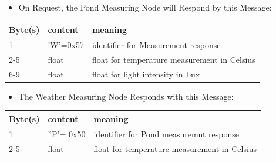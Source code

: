\documentclass{beamer}
\begin{document}
\frame
{

	\begin{itemize}
	
	\item On Request, the Pond Measuring Node will Respond by this Message:
	
	\end{itemize}
	
	\begin{table}
    \begin{tabular}{|p{3cm}|p{3cm}|p{3cm}|}
    \hline
    Byte(s) & content  & meaning                                      \\ \hline
    1       & 'W'=0x57 & identifier for Measurement response          \\ \hline
    2-5     & float    & float for temperature measurement in Celsius \\ \hline
    6-9     & float    & float for light intensity in Lux             \\ \hline
    \end{tabular}
	\end{table}
}

\frame
{
	\begin{itemize}
	\item The Weather Measuring Node Responds with this Message:
	\end{itemize}
	
	\begin{table}[h]
    \begin{tabular}{|p{3cm}|p{3cm}|p{3cm}|}
    \hline
    Byte(s) & content  		& meaning                            \\ \hline
    1       & ''P'= 0x50 	& identifier for Pond measuremnt response \\ \hline
    2-5		& float			& float for temperature measurement in Celsius \\ \hline
    \end{tabular}
	\end{table}
}
\end{document}
